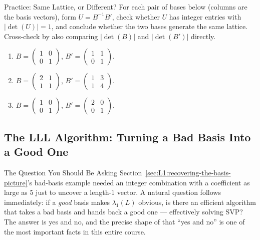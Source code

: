 \begin{exercisebox}{Practice: Same Lattice, or Different?}
For each pair of bases below (columns are the basis vectors), form $U = B^{-1}B'$, check whether $U$ has integer entries with $|\det(U)|=1$, and conclude whether the two bases generate the same lattice. Cross-check by also comparing $|\det(B)|$ and $|\det(B')|$ directly.
\begin{enumerate}[leftmargin=*, label=(\alph*)]
  \item $B = \begin{pmatrix}1 & 0 \\ 0 & 1\end{pmatrix}$, $B' = \begin{pmatrix}1 & 1 \\ 0 & 1\end{pmatrix}$.
  \item $B = \begin{pmatrix}2 & 1 \\ 1 & 1\end{pmatrix}$, $B' = \begin{pmatrix}1 & 3 \\ 1 & 4\end{pmatrix}$.
  \item $B = \begin{pmatrix}1 & 0 \\ 0 & 1\end{pmatrix}$, $B' = \begin{pmatrix}2 & 0 \\ 0 & 1\end{pmatrix}$.
\end{enumerate}
\end{exercisebox}

\subsection{The LLL Algorithm: Turning a Bad Basis Into a Good One}
\label{sec:L1:the-lll-algorithm}

\begin{rmkbox}{The Question You Should Be Asking}
Section~\ref{sec:L1:recovering-the-basis-picture}'s bad-basis example needed an integer combination with a coefficient as large as $5$ just to uncover a length-$1$ vector. A natural question follows immediately: if a \emph{good} basis makes $\lambda_1(L)$ obvious, is there an efficient algorithm that takes a bad basis and hands back a good one --- effectively solving SVP? The answer is yes and no, and the precise shape of that ``yes and no'' is one of the most important facts in this entire course.
\end{rmkbox}


